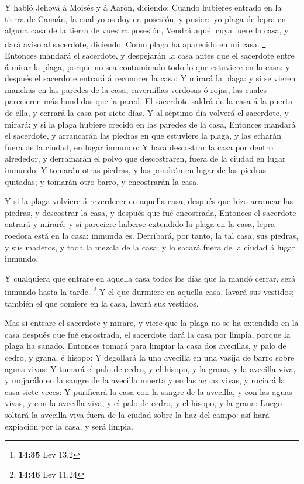  Y habló Jehová á Moisés y á Aarón, diciendo:
 Cuando hubieres entrado en la tierra de Canaán, la cual
yo os doy en posesión, y pusiere yo plaga de lepra en alguna casa de la
tierra de vuestra posesión,  Vendrá aquél cuya fuere la
casa, y dará aviso al sacerdote, diciendo: Como plaga ha aparecido en mi
casa. \footnote{\textbf{14:35} Lev 13,2}  Entonces
mandará el sacerdote, y despejarán la casa antes que el sacerdote entre
á mirar la plaga, porque no sea contaminado todo lo que estuviere en la
casa: y después el sacerdote entrará á reconocer la casa:
 Y mirará la plaga: y si se vieren manchas en las paredes
de la casa, cavernillas verdosas ó rojas, las cuales parecieren más
hundidas que la pared,  El sacerdote saldrá de la casa á
la puerta de ella, y cerrará la casa por siete días.  Y
al séptimo día volverá el sacerdote, y mirará: y si la plaga hubiere
crecido en las paredes de la casa,  Entonces mandará el
sacerdote, y arrancarán las piedras en que estuviere la plaga, y las
echarán fuera de la ciudad, en lugar inmundo:  Y hará
descostrar la casa por dentro alrededor, y derramarán el polvo que
descostraren, fuera de la ciudad en lugar inmundo:  Y
tomarán otras piedras, y las pondrán en lugar de las piedras quitadas; y
tomarán otro barro, y encostrarán la casa.

 Y si la plaga volviere á reverdecer en aquella casa,
después que hizo arrancar las piedras, y descostrar la casa, y después
que fué encostrada,  Entonces el sacerdote entrará y
mirará; y si pareciere haberse extendido la plaga en la casa, lepra
roedora está en la casa: inmunda es.  Derribará, por
tanto, la tal casa, sus piedras, y sus maderos, y toda la mezcla de la
casa; y lo sacará fuera de la ciudad á lugar inmundo.

 Y cualquiera que entrare en aquella casa todos los días
que la mandó cerrar, será inmundo hasta la tarde. \footnote{\textbf{14:46}
  Lev 11,24}  Y el que durmiere en aquella casa, lavará
sus vestidos; también el que comiere en la casa, lavará sus vestidos.

 Mas si entrare el sacerdote y mirare, y viere que la
plaga no se ha extendido en la casa después que fué encostrada, el
sacerdote dará la casa por limpia, porque la plaga ha sanado.
 Entonces tomará para limpiar la casa dos avecillas, y
palo de cedro, y grana, é hisopo:  Y degollará la una
avecilla en una vasija de barro sobre aguas vivas:  Y
tomará el palo de cedro, y el hisopo, y la grana, y la avecilla viva, y
mojarálo en la sangre de la avecilla muerta y en las aguas vivas, y
rociará la casa siete veces:  Y purificará la casa con la
sangre de la avecilla, y con las aguas vivas, y con la avecilla viva, y
el palo de cedro, y el hisopo, y la grana:  Luego soltará
la avecilla viva fuera de la ciudad sobre la haz del campo: así hará
expiación por la casa, y será limpia.

